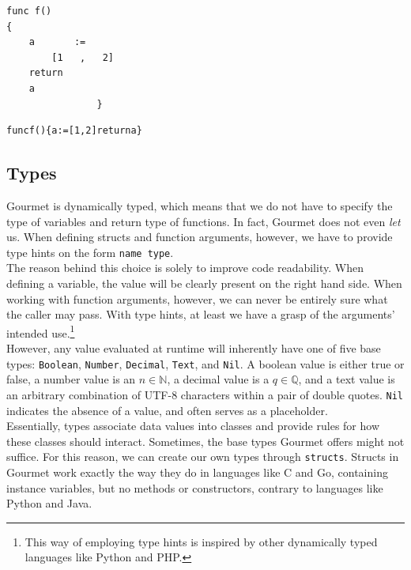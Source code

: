 \begin{lstlisting}[caption={A Gourmet program with a lot of whitespace.}, captionpos=b, label={f with a lot of whitespace.}]
func f()
{
    a       :=
        [1   ,   2]
    return
    a
                }
\end{lstlisting}

\begin{lstlisting}[caption={A Gourmet program with no whitespace.}, captionpos=b, label={f with no whitespace.}]
funcf(){a:=[1,2]returna}
\end{lstlisting}

\subsection{Types}

Gourmet is dynamically typed, which means that we do not have to specify the type of variables and return type of functions. In fact, Gourmet does not even \textit{let} us. When defining structs and function arguments, however, we have to provide type hints on the form \texttt{name type}. \\

The reason behind this choice is solely to improve code readability. When defining a variable, the value will be clearly present on the right hand side. When working with function arguments, however, we can never be entirely sure what the caller may pass. With type hints, at least we have a grasp of the arguments' intended use.\footnote{This way of employing type hints is inspired by other dynamically typed languages like Python and PHP.} \\

However, any value evaluated at runtime will inherently have one of five base types:  \texttt{Boolean}, \texttt{Number}, \texttt{Decimal}, \texttt{Text}, and \texttt{Nil}. A boolean value is either true or false, a number value is an  $n \in \mathbb{N}$, a decimal value is a $q \in \mathbb{Q}$, and a text value is an arbitrary combination of UTF-8 characters within a pair of double quotes. \texttt{Nil} indicates the absence of a value, and often serves as a placeholder. \\

Essentially, types associate data values into classes and provide rules for how these classes should interact. Sometimes, the base types Gourmet offers might not suffice. For this reason, we can create our own types through \texttt{structs}. Structs in Gourmet work exactly the way they do in languages like C and Go, containing instance variables, but no methods or constructors, contrary to languages like Python and Java. \\

